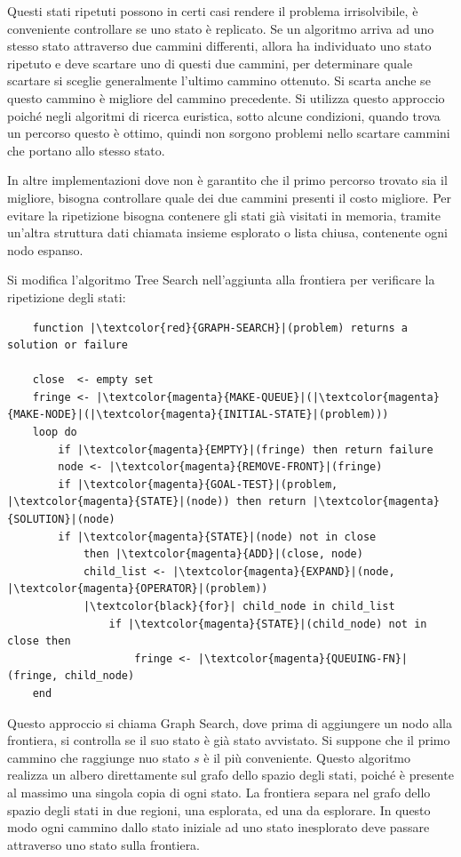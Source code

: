 \documentclass{article}
\numberwithin{equation}{subsection}
\begin{document}
Questi stati ripetuti possono in certi casi rendere il problema irrisolvibile, è conveniente 
controllare se uno stato è replicato. Se un algoritmo arriva ad uno stesso stato attraverso 
due cammini differenti, allora ha individuato uno stato ripetuto e deve scartare uno di questi 
due cammini, per determinare quale scartare si sceglie generalmente l'ultimo cammino ottenuto. 
Si scarta anche se questo cammino è migliore del cammino precedente. Si utilizza questo 
approccio poiché negli algoritmi di ricerca euristica, sotto alcune condizioni, quando trova 
un percorso questo è ottimo, quindi non sorgono problemi nello scartare cammini che portano allo 
stesso stato. 

In altre implementazioni dove non è garantito che il primo percorso trovato sia il migliore, 
bisogna controllare quale dei due cammini presenti il costo migliore. 
Per evitare la ripetizione bisogna contenere gli stati già visitati in memoria, tramite 
un'altra struttura dati chiamata insieme esplorato o lista chiusa, contenente ogni nodo 
espanso. 

Si modifica l'algoritmo Tree Search nell'aggiunta alla frontiera per verificare la ripetizione 
degli stati:
\begin{verbatim}
    function |\textcolor{red}{GRAPH-SEARCH}|(problem) returns a solution or failure

    close  <- empty set
    fringe <- |\textcolor{magenta}{MAKE-QUEUE}|(|\textcolor{magenta}{MAKE-NODE}|(|\textcolor{magenta}{INITIAL-STATE}|(problem)))
    loop do
        if |\textcolor{magenta}{EMPTY}|(fringe) then return failure
        node <- |\textcolor{magenta}{REMOVE-FRONT}|(fringe)
        if |\textcolor{magenta}{GOAL-TEST}|(problem, |\textcolor{magenta}{STATE}|(node)) then return |\textcolor{magenta}{SOLUTION}|(node)
        if |\textcolor{magenta}{STATE}|(node) not in close
            then |\textcolor{magenta}{ADD}|(close, node)
            child_list <- |\textcolor{magenta}{EXPAND}|(node, |\textcolor{magenta}{OPERATOR}|(problem))
            |\textcolor{black}{for}| child_node in child_list 
                if |\textcolor{magenta}{STATE}|(child_node) not in close then 
                    fringe <- |\textcolor{magenta}{QUEUING-FN}|(fringe, child_node)
    end
\end{verbatim}

Questo approccio si chiama Graph Search, dove prima di aggiungere un nodo alla frontiera, si controlla 
se il suo stato è già stato avvistato. Si suppone che il primo cammino che raggiunge nuo stato $s$ 
è il più conveniente. 
Questo algoritmo realizza un albero direttamente sul grafo dello spazio degli stati, poiché 
è presente al massimo una singola copia di ogni stato. La frontiera separa nel grafo dello 
spazio degli stati in due regioni, una esplorata, ed una da esplorare. In questo modo ogni 
cammino dallo stato iniziale ad uno stato inesplorato deve passare attraverso uno stato 
sulla frontiera. 
\end{document}
